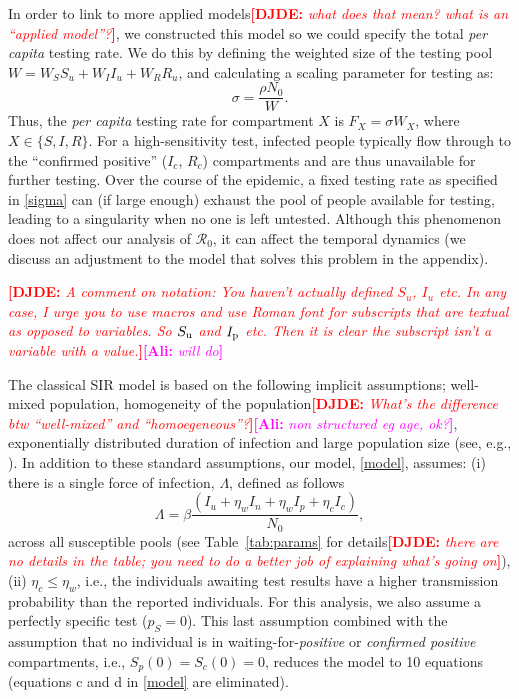 \documentclass[12pt]{article}
\newcommand{\percap}{\emph{per capita}\xspace}
\newcommand{\Rnum}{\mathcal{R}_0}
\newcommand{\comment}{\showcomment}
\newcommand{\showcomment}[3]{\textcolor{#1}{\textbf{[#2: }\textsl{#3}\textbf{]}}}
\newcommand{\ali}[1]{\comment{magenta}{Ali}{#1}}
\newcommand{\david}[1]{\comment{red}{DJDE}{#1}}
\theoremstyle{definition} %
\begin{document}
In order to link to more applied models\david{what does that mean?  what is an ``applied model''?}, we constructed this model so we could specify the total \percap testing rate. We do this by defining the weighted size of the testing pool $W = W_S S_u + W_I I_u + W_R R_u$, and calculating a scaling parameter for testing as:
\begin{equation}
\label{sigma}
\sigma = \frac{\rho N_0}{W}.
\end{equation}
Thus, the \percap testing rate for compartment $X$ is $F_X=\sigma W_X$, where $X \in \{S,I,R\}$. 
For a high-sensitivity test, infected people typically flow through to the ``confirmed positive'' ($I_c$, $R_c$) compartments and are thus unavailable for further testing.  Over the course of the epidemic, a fixed testing rate as specified in \eqref{sigma} can (if large enough) exhaust the pool of people available for testing, leading to a singularity when no one is left untested.  Although this phenomenon does not affect our analysis of $\Rnum$, it can affect the temporal dynamics (we discuss an adjustment to the model that solves this problem in the appendix).

\david{A comment on notation:  You haven't actually defined $S_u$, $I_u$ etc.  In any case, I urge you to use macros and use Roman font for subscripts that are textual as opposed to variables.  So $S_{\rm u}$ and $I_{\rm p}$ etc.  Then it is clear the subscript isn't a variable with a value.}\ali{will do}

The classical SIR model is based on the following implicit assumptions; well-mixed population, homogeneity of the population\david{What's the difference btw ``well-mixed'' and ``homoegeneous''?}\ali{ non structured eg age, ok?}, exponentially distributed duration of infection and large population size (see, e.g., \cite{keeling2011modeling}). In addition to these standard assumptions, our model, \ref{model}, assumes: (i) there is a single force of infection, $\Lambda$, defined as follows
\begin{equation}
\label{Lambda}
\Lambda=\beta \frac{(I_u+\eta_w I_n+\eta_w I_p+ \eta_c I_c)}{N_0},
\end{equation}
across all susceptible pools (see Table~\ref{tab:params} for details\david{there are no details in the table; you need to do a better job of explaining what's going on}), (ii) $\eta_c \leq \eta_w$, i.e., the individuals awaiting test results have a higher transmission probability than the reported individuals. For this analysis, we also assume a perfectly specific test ($p_S=0$). This last assumption combined with the assumption that no individual is in waiting-for-\emph{positive} or \emph{confirmed positive} compartments, i.e., $S_p(0)=S_c(0)=0$, reduces the model to 10 equations (equations c and d  in \eqref{model} are eliminated).
\end{document}
